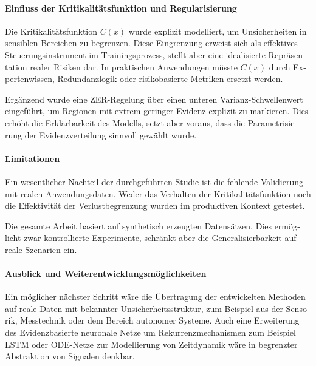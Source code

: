 \begin{otherlanguage}{ngerman}
\paragraph{Einfluss der Kritikalitätsfunktion und Regularisierung}

Die Kritikalitätsfunktion $C(x)$ wurde explizit modelliert, um Unsicherheiten in sensiblen Bereichen zu begrenzen. Diese Eingrenzung erweist sich als effektives Steuerungsinstrument im Trainingsprozess, stellt aber eine idealisierte Repräsentation realer Risiken dar. In praktischen Anwendungen müsste $C(x)$ durch Expertenwissen, Redundanzlogik oder risikobasierte Metriken ersetzt werden.

Ergänzend wurde eine ZER-Regelung über einen unteren Varianz-Schwellenwert eingeführt, um Regionen mit extrem geringer Evidenz explizit zu markieren. Dies erhöht die Erklärbarkeit des Modells, setzt aber voraus, dass die Parametrisierung der Evidenzverteilung sinnvoll gewählt wurde.

\paragraph{Limitationen}

Ein wesentlicher Nachteil der durchgeführten Studie ist die fehlende Validierung mit realen Anwendungsdaten. 
Weder das Verhalten der Kritikalitätsfunktion noch die Effektivität der Verlustbegrenzung wurden im produktiven Kontext getestet. 

Die gesamte Arbeit basiert auf synthetisch erzeugten Datensätzen. 
Dies ermöglicht zwar kontrollierte Experimente, schränkt aber die Generalisierbarkeit auf reale Szenarien ein.

\paragraph{Ausblick und Weiterentwicklungsmöglichkeiten}

Ein möglicher nächster Schritt wäre die Übertragung der entwickelten Methoden auf reale Daten mit bekannter Unsicherheitsstruktur, zum Beispiel aus der Sensorik, Messtechnik oder dem Bereich autonomer Systeme. 
Auch eine Erweiterung des \gls{Evidenzbasierte neuronale Netze} um Rekurrenzmechanismen zum Beispiel LSTM oder ODE-Netze zur Modellierung von Zeitdynamik wäre in begrenzter Abstraktion von Signalen denkbar.


\end{otherlanguage}
